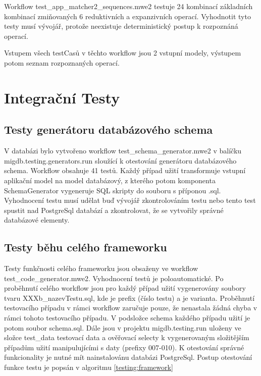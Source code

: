 \documentclass[11pt,twoside,a4paper]{book}
\begin{document}
Workflow test\_app\_matcher2\_sequences.mwe2 testuje 24 kombinací základních
kombinací zmiňovaných 6 reduktivních a expanzivních operací. Vyhodnotit tyto
testy musí vývojář, protože neexistuje deterministický postup k rozpoznáná
operací.

Vstupem všech testCasů v těchto workflow jsou 2 vstupní modely, výstupem potom
seznam rozpoznaných operací.

\section{Integrační Testy}
\subsection{Testy generátoru databázového schema}
V databázi bylo vytvořeno workflow test\_schema\_generator.mwe2 v balíčku
migdb.testing.generators.run sloužící k otestování generátoru databázového
schema. Workflow obsahuje 41 testů. Každý případ užití transformuje vstupní
aplikační model na model databázový, z kterého potom komponenta SchemaGenerator
vygeneruje SQL skripty do souboru s příponou .sql. Vyhodnocení testu musí udělat
buď vývojář zkontrolováním testu nebo tento test spustit nad PostgreSql
databází a zkontrolovat, že se vytvořily správné databázové elementy.

\subsection{Testy běhu celého frameworku}
Testy funkčnosti celého frameworku jsou obsaženy ve workflow
test\_code\_generator.mwe2. Vyhodnocení testů je poloautomatické. Po proběhnutí
celého workflow jsou pro každý případ užití vygenerovány soubory tvaru
XXXb\_nazevTestu.sql, kde  je prefix (číslo testu) a   je
varianta. Proběhnutí testovacího případu v rámci workflow zaručuje pouze, že
nenastala žádná chyba v rámci tohoto testovacího případu.
V podsložce schema každého případu užití je potom soubor schema.sql. Dále jsou v
projektu migdb.testing.run uloženy ve složce test\_data testovací data a
ověřovací selecty k vygenerovaným složitějším případům užití manipulujícími s daty (prefixy 007-010).
K otestování správné funkcionality je nutné mít nainstalovánu databázi
PostgreSql. Postup otestování funkce testu je popsán v algoritmu
\ref{testing:framework}
\end{document}
